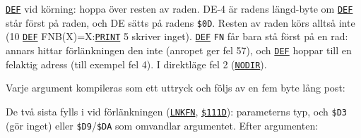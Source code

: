 \begin{Listing}
\Gap
\begin{Cmt}\par\noindent \hyperlink{l:DEF}{\texttt{DEF}} vid körning: hoppa över resten av raden. DE\mbox{-}4 är radens längd-byte om \hyperlink{l:DEF}{\texttt{DEF}} står först på raden, och DE sätts på radens \texttt{\$0D}. Resten av raden körs alltså inte ({}10 \hyperlink{l:DEF}{\texttt{DEF}} FNB(X)=X:\hyperlink{l:PRINT}{\texttt{PRINT}} 5{} skriver inget). \hyperlink{l:DEF}{\texttt{DEF}} \texttt{FN} får bara stå först på en rad: annars hittar förlänkningen den inte (anropet ger fel 57), och \hyperlink{l:DEF}{\texttt{DEF}} hoppar till en felaktig adress (till exempel fel 4). I direktläge fel 2 (\hyperlink{l:NODIR}{\texttt{NODIR}}).\par\end{Cmt}
\Gap
{}
\begin{Note}\par\noindent Varje argument kompileras som ett uttryck och följs av en fem byte lång post:\par
\begin{Verb}
\end{Verb}
\par\noindent De två sista fylls i vid förlänkningen (\hyperlink{l:LNKFN}{\texttt{LNKFN}}, \hyperlink{a:111D}{\texttt{\$111D}}): parameterns typ, och \texttt{\$D3} (gör inget) eller \texttt{\$D9}/\texttt{\$DA} som omvandlar argumentet. Efter argumenten:\par
\begin{Verb}

\end{Verb}
\end{Note}
\end{Listing}
